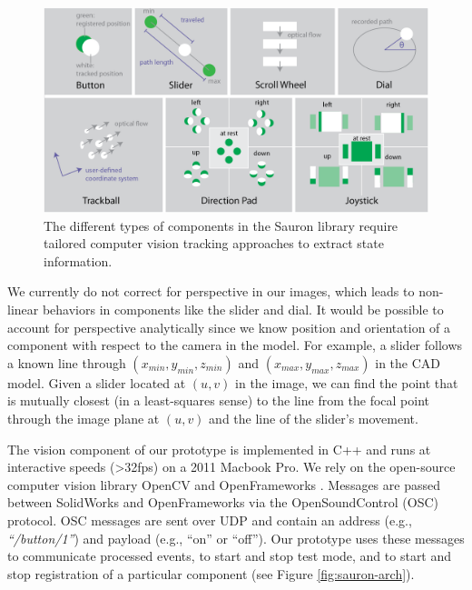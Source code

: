 \begin{figure}
\centering
\includegraphics[width=\textwidth]{figures/sauron/vision-all-components.png}
\caption{The different types of components in the Sauron library require tailored computer vision tracking approaches to extract state information.}
\label{fig:sauron-vision}
\end{figure}

We currently do not correct for perspective in our images, which leads to non-linear behaviors in components like the slider and dial. It would be possible to account for perspective analytically since we know position and orientation of a component with respect to the camera in the model. For example, a slider follows a known line through $(x_{min}, y_{min},z_{min})$ and $(x_{max},y_{max},z_{max})$   in the CAD model.
Given a slider located at $(u,v)$ in the image, we can find the point that is mutually closest (in a least-squares sense) to the line from the focal point through the image plane at $(u,v)$ and the line of the slider's movement.

The vision component of our prototype is implemented in C++ and runs at interactive speeds (\textgreater 32fps) on a 2011 Macbook Pro. We rely on the open-source computer vision library OpenCV \cite{opencv} and OpenFrameworks \cite{openframeworks}.
Messages are passed between SolidWorks and OpenFrameworks via the OpenSoundControl (OSC) protocol. OSC messages are sent over UDP and contain an address (e.g., {\em ``/button/1''}) and payload (e.g., ``on'' or ``off''). Our prototype uses these messages to communicate processed events, to start and stop test mode, and to start and stop registration of a particular component (see Figure \ref{fig:sauron-arch}).

